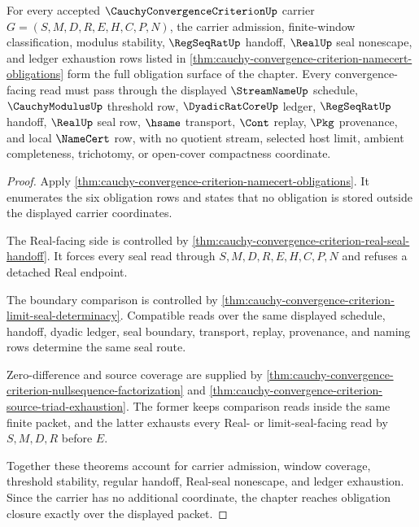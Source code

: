\begin{theorem}
\label{thm:cauchy-convergence-criterion-obligation-closure-upgrade}
For every accepted $\CauchyConvergenceCriterionUp$ carrier $G=(S,M,D,R,E,H,C,P,N)$, the carrier admission, finite-window classification, modulus stability, $\RegSeqRatUp$ handoff, $\RealUp$ seal nonescape, and ledger exhaustion rows listed in \autoref{thm:cauchy-convergence-criterion-namecert-obligations} form the full obligation surface of the chapter. Every convergence-facing read must pass through the displayed $\StreamNameUp$ schedule, $\CauchyModulusUp$ threshold row, $\DyadicRatCoreUp$ ledger, $\RegSeqRatUp$ handoff, $\RealUp$ seal row, $\hsame$ transport, $\Cont$ replay, $\Pkg$ provenance, and local $\NameCert$ row, with no quotient stream, selected host limit, ambient completeness, trichotomy, or open-cover compactness coordinate.
\end{theorem}
\begin{proof}
Apply \autoref{thm:cauchy-convergence-criterion-namecert-obligations}. It enumerates the six obligation rows and states that no obligation is stored outside the displayed carrier coordinates.

The Real-facing side is controlled by \autoref{thm:cauchy-convergence-criterion-real-seal-handoff}. It forces every seal read through $S,M,D,R,E,H,C,P,N$ and refuses a detached Real endpoint.

The boundary comparison is controlled by \autoref{thm:cauchy-convergence-criterion-limit-seal-determinacy}. Compatible reads over the same displayed schedule, handoff, dyadic ledger, seal boundary, transport, replay, provenance, and naming rows determine the same seal route.

Zero-difference and source coverage are supplied by \autoref{thm:cauchy-convergence-criterion-nullsequence-factorization} and \autoref{thm:cauchy-convergence-criterion-source-triad-exhaustion}. The former keeps comparison reads inside the same finite packet, and the latter exhausts every Real- or limit-seal-facing read by $S,M,D,R$ before $E$.

Together these theorems account for carrier admission, window coverage, threshold stability, regular handoff, Real-seal nonescape, and ledger exhaustion. Since the carrier has no additional coordinate, the chapter reaches obligation closure exactly over the displayed packet.
\end{proof}

